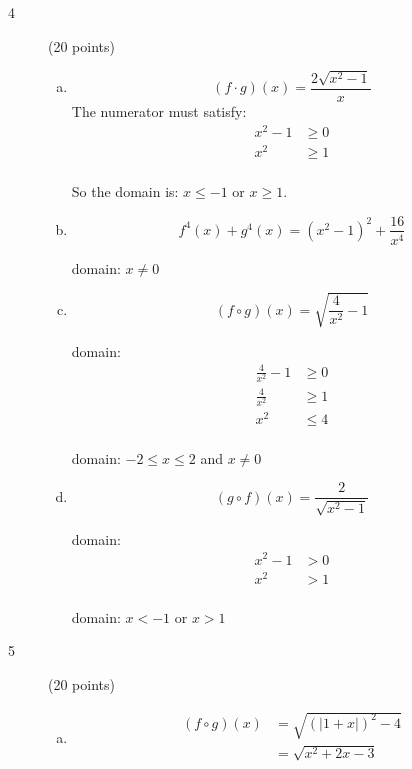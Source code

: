 \documentclass{exam}
\begin{document}
\begin{description}
\begin{enumerate}[(a)]
\end{enumerate}

\item[4] (20 points)
\begin{enumerate}[(a)]

\item 
\[
  (f \cdot g)(x) = \frac{2\sqrt{x^2-1}}{x}
\]
The numerator must satisfy:
\begin{align*} 
  x^2-1 &\geq 0 \\
  x^2   &\geq 1 \\
\end{align*} 

So the domain is: $x \leq -1$ or $x \geq 1$.

\item
\[
  f^4(x) + g^4(x) = (x^2-1)^2 + \frac{16}{x^4}
\]

domain: $x \neq 0$

\item
\[
  (f \circ g)(x) = \sqrt{\frac{4}{x^2} - 1}
\]

domain:
\begin{align*}
  \frac{4}{x^2} - 1 &\geq 0 \\
  \frac{4}{x^2}     &\geq 1 \\
  x^2               &\leq 4 \\
\end{align*}

domain: $-2 \leq x \leq 2$ and $x \neq 0$

\item
\[
  (g \circ f)(x) = \frac{2}{\sqrt{x^2-1}}
\]

domain:
\begin{align*}
  x^2 - 1 &> 0 \\
  x^2 &> 1 \\
\end{align*}

domain: $x < -1$ or $x > 1$

\end{enumerate}

\item[5] (20 points)
\begin{enumerate}[(a)]

\item
\begin{align*}
  (f \circ g)(x) &= \sqrt{(| 1 + x |)^2 - 4} \\
                 &= \sqrt{x^2 + 2x - 3} \\
\end{align*}


\end{enumerate}
\end{description}
\end{document}
